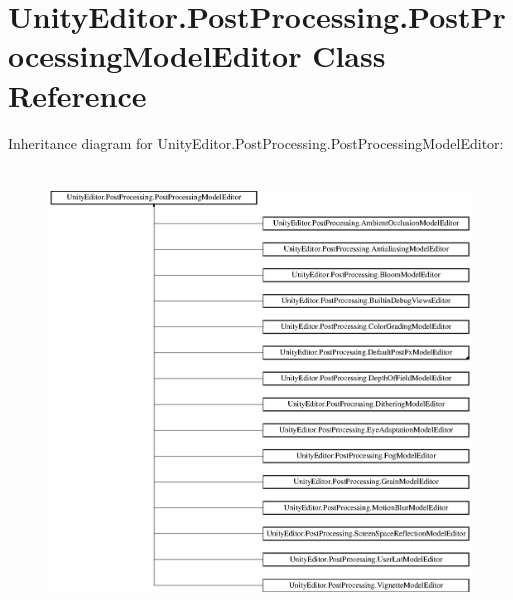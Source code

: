 \hypertarget{class_unity_editor_1_1_post_processing_1_1_post_processing_model_editor}{}\section{Unity\+Editor.\+Post\+Processing.\+Post\+Processing\+Model\+Editor Class Reference}
\label{class_unity_editor_1_1_post_processing_1_1_post_processing_model_editor}
Inheritance diagram for Unity\+Editor.\+Post\+Processing.\+Post\+Processing\+Model\+Editor\+:\begin{figure}[H]
\begin{center}
\leavevmode
\includegraphics[height=11.883289cm]{class_unity_editor_1_1_post_processing_1_1_post_processing_model_editor}
\end{center}
\end{figure}
